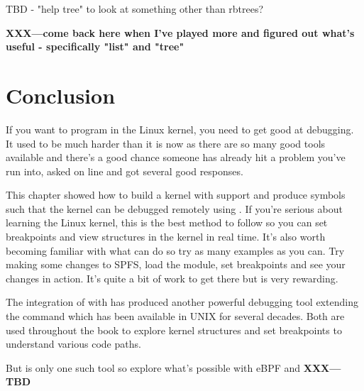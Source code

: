 TBD - "help tree" to look at something other than rbtrees?

\textbf{XXX---come back here when I've played more and figured out what's useful - specifically "list" and "tree"}



\section{Conclusion}

If you want to program in the Linux kernel, you need to get good at debugging. It used to be much harder than it is now as there are so many good tools available and there's a good chance someone has already hit a problem you've run into, asked on line and got several good responses.

This chapter showed how to build a kernel with  support and produce symbols such that the kernel can be debugged remotely using . If you're serious about learning the Linux kernel, this is the best method to follow so you can set breakpoints and view structures in the kernel in real time. It's also worth becoming familiar with what  can do so try as many examples as you can. Try making some changes to SPFS, load the module, set breakpoints and see your changes in action. It's quite a bit of work to get there but is very rewarding.

The integration of  with  has produced another powerful debugging tool extending the  command which has been available in UNIX for several decades. Both are used throughout the book to explore kernel structures and set breakpoints to understand various code paths.

But  is only one such tool so explore what's possible with eBPF and \textbf{XXX---TBD}

